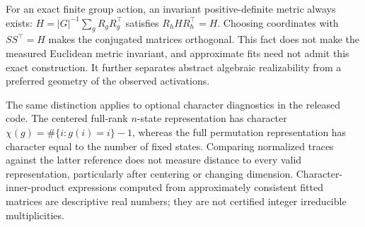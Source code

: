 For an exact finite group action, an invariant positive-definite metric always exists: $H=|G|^{-1}\sum_gR_gR_g^\top$ satisfies $R_hHR_h^\top=H$. Choosing coordinates with $SS^\top=H$ makes the conjugated matrices orthogonal. This fact does not make the measured Euclidean metric invariant, and approximate fits need not admit this exact construction. It further separates abstract algebraic realizability from a preferred geometry of the observed activations.

The same distinction applies to optional character diagnostics in the released code. The centered full-rank $n$-state representation has character $\chi(g)=\#\{i:g(i)=i\}-1$, whereas the full permutation representation has character equal to the number of fixed states. Comparing normalized traces against the latter reference does not measure distance to every valid representation, particularly after centering or changing dimension. Character-inner-product expressions computed from approximately consistent fitted matrices are descriptive real numbers; they are not certified integer irreducible multiplicities.
